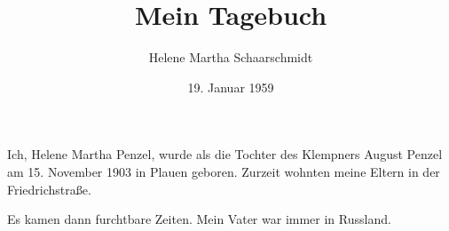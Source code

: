 \documentclass[a5paper]{book}
\title{Mein Tagebuch}
\author{Helene Martha Schaarschmidt}
\date{19. Januar 1959}
\begin{document}
\maketitle

\newpage
\setcounter{page}{1}
Ich, Helene Martha Penzel, wurde als die Tochter des Klempners August Penzel am 15. November 1903 in Plauen geboren. 
Zurzeit wohnten meine Eltern in der Friedrichstraße.

\newpage
Es kamen dann furchtbare Zeiten.
Mein Vater war immer in Russland.


\newpage
\end{document}
